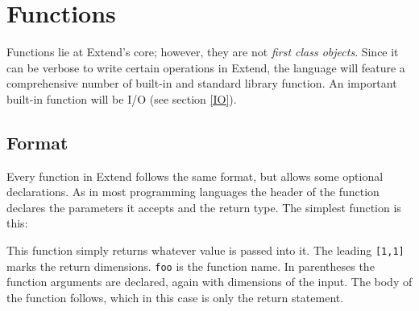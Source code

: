 \section{Functions}
Functions lie at Extend's core; however, they are not \textit{first class objects}. Since it can be verbose to write certain operations in Extend, the language will feature a comprehensive number of built-in and standard library function. An important built-in function will be I/O (see section \ref{IO}).
\subsection{Format}
Every function in Extend follows the same format, but allows some optional declarations. As in most programming languages the header of the function declares the parameters it accepts and the return type. The simplest function is this:

This function simply returns whatever value is passed into it. The leading \texttt{[1,1]} marks the return dimensions. \texttt{foo} is the function name. In parentheses the function arguments are declared, again with dimensions of the input. The body of the function follows, which in this case is only the return statement.
